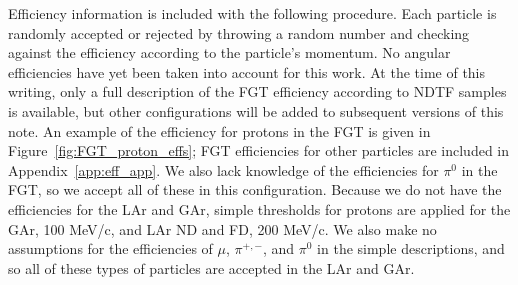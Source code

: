 \documentclass[12pt]{article}
\begin{document}
Efficiency information is included with the following procedure. Each particle is randomly accepted or rejected by throwing a random number and checking against the efficiency according to the particle's momentum. No angular efficiencies have yet been taken into account for this work. At the time of this writing, only a full description of the FGT efficiency according to NDTF samples is available, but other configurations will be added to subsequent versions of this note. An example of the efficiency for protons in the FGT is given in Figure~\ref{fig:FGT_proton_effs}; FGT efficiencies for other particles are included in Appendix~\ref{app:eff_app}. We also lack knowledge of the efficiencies for $\pi^0$ in the FGT, so we accept all of these in this configuration. Because we do not have the efficiencies for the LAr and GAr, simple thresholds for protons are applied for the GAr, 100 MeV/c, and LAr ND and FD, 200 MeV/c. We also make no assumptions for the efficiencies of $\mu$, $\pi^{+,-}$, and $\pi^{0}$ in the simple  descriptions, and so all of these types of particles are accepted in the LAr and GAr.
\end{document}
